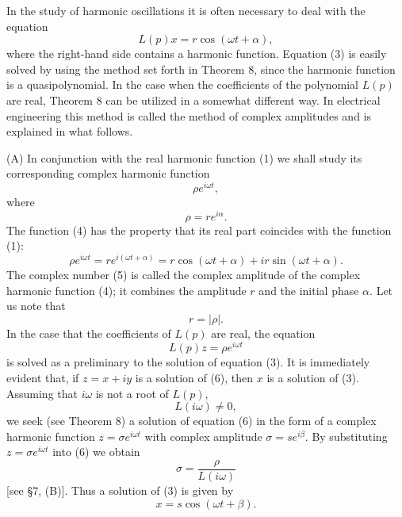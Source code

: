\documentclass[10pt,a5paper]{book}
\theoremstyle{plain}
\theoremstyle{definition}
\theoremstyle{remark}
\begin{document}
In the study of harmonic oscillations it is often necessary to deal with the equation
\begin{equation*}
L(p) x=r \cos (\omega t+\alpha), \tag{3}
\end{equation*}
where the right-hand side contains a harmonic function. Equation (3) is easily solved by using the method set forth in Theorem 8, since the harmonic function is a quasipolynomial. In the case when the coefficients of the polynomial $L(p)$ are real, Theorem 8 can be utilized in a somewhat different way. In electrical engineering this method is called the method of complex amplitudes and is explained in what follows.

(A) In conjunction with the real harmonic function (1) we shall study its corresponding complex harmonic function
\begin{equation*}
\rho e^{i \omega t}, \tag{4}
\end{equation*}
where
\begin{equation*}
\rho=r e^{i \alpha} . \tag{5}
\end{equation*}
The function (4) has the property that its real part coincides with the function (1):
\[
\rho e^{i \omega t}=r e^{i(\omega t+\alpha)}=r \cos (\omega t+\alpha)+i r \sin (\omega t+\alpha) .
\]
The complex number (5) is called the complex amplitude of the complex harmonic function (4); it combines the amplitude $r$ and the initial phase $\alpha$. Let us note that
\[
r=|\rho| .
\]
In the case that the coefficients of $L(p)$ are real, the equation
\begin{equation*}
L(p) z=\rho e^{i \omega t} \tag{6}
\end{equation*}
is solved as a preliminary to the solution of equation (3). It is immediately evident that, if $z=x+i y$ is a solution of (6), then $x$ is a solution of (3). Assuming that $i \omega$ is not a root of $L(p)$,
\begin{equation*}
L(i \omega) \neq 0, \tag{7}
\end{equation*}
we seek (see Theorem 8) a solution of equation (6) in the form of a complex harmonic function $z=\sigma e^{i \omega t}$ with complex amplitude $\sigma=s e^{i \beta}$. By substituting $z=\sigma e^{i \omega t}$ into (6) we obtain
\begin{equation*}
\sigma=\frac{\rho}{L(i \omega)} \tag{8}
\end{equation*}
[see §7, (B)]. Thus a solution of (3) is given by
\begin{equation*}
x=s \cos (\omega t+\beta) . \tag{9}
\end{equation*}
\end{document}
